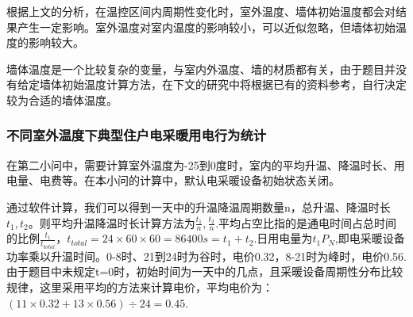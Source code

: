 \documentclass[withoutpreface,bwprint]{cumcmthesis} %
\begin{document}
根据上文的分析，在温控区间内周期性变化时，室外温度、墙体初始温度都会对结果产生一定影响。室外温度对室内温度的影响较小，可以近似忽略，但墙体初始温度的影响较大。

墙体温度是一个比较复杂的变量，与室内外温度、墙的材质都有关，由于题目并没有给定墙体初始温度计算方法，在下文的研究中将根据已有的资料参考，自行决定较为合适的墙体温度。
\subsubsection{不同室外温度下典型住户电采暖用电行为统计}
在第二小问中，需要计算室外温度为-25到0度时，室内的平均升温、降温时长、用电量、电费等。在本小问的计算中，默认电采暖设备初始状态关闭。

通过软件计算，我们可以得到一天中的升温降温周期数量n，总升温、降温时长$t_1,t_2$。则平均升温降温时长计算方法为$\frac{t_1}{n},\frac{t_2}{n}$.平均占空比指的是通电时间占总时间的比例$\frac{t_1}{t_{total}}$，${t_{total}}=24\times 60\times 60=86400s=t_1+t_2$.日用电量为$t_1P_N$,即电采暖设备功率乘以升温时间。0-8时、21到24时为谷时，电价0.32，8-21时为峰时，电价0.56.由于题目中未规定t=0时，初始时间为一天中的几点，且采暖设备周期性分布比较规律，这里采用平均的方法来计算电价，平均电价为：$(11\times 0.32 + 13\times 0.56)\div 24 = 0.45$.
\end{document}
